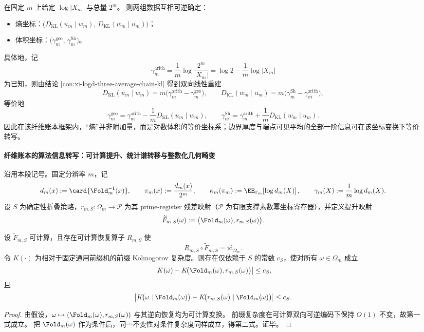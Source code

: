 \begin{conclusion}\label{con:xi-entropy-volume-dual-coordinates}
在固定 \(m\) 上给定 \(\log|X_m|\) 与总量 \(2^m\)。
则两组数据互相可逆确定：
\begin{itemize}
  \item 熵坐标：\(\bigl(D_{\mathrm{KL}}(u_m\mid w_m),\,D_{\mathrm{KL}}(w_m\mid u_m)\bigr)\)；
  \item 体积坐标：\(\bigl(\gamma_m^{\mathrm{geo}},\,\gamma_m^{\mathrm{Sh}}\bigr)\)。
\end{itemize}
具体地，记
\[
\gamma_m^{\mathrm{arith}}
=\frac{1}{m}\log\frac{2^m}{|X_m|}
=\log 2-\frac{1}{m}\log|X_m|
\]
为已知，则由结论 \ref{con:xi-logd-three-average-chain-kl} 得到双向线性重建
\[
D_{\mathrm{KL}}(u_m\mid w_m)=m\bigl(\gamma_m^{\mathrm{arith}}-\gamma_m^{\mathrm{geo}}\bigr),
\qquad
D_{\mathrm{KL}}(w_m\mid u_m)=m\bigl(\gamma_m^{\mathrm{Sh}}-\gamma_m^{\mathrm{arith}}\bigr),
\]
等价地
\[
\gamma_m^{\mathrm{geo}}=\gamma_m^{\mathrm{arith}}-\frac{1}{m}D_{\mathrm{KL}}(u_m\mid w_m),
\qquad
\gamma_m^{\mathrm{Sh}}=\gamma_m^{\mathrm{arith}}+\frac{1}{m}D_{\mathrm{KL}}(w_m\mid u_m).
\]
因此在该纤维账本框架内，“熵”并非附加量，而是对数体积的等价坐标系；边界厚度与端点可见平均的全部一阶信息可在该坐标变换下等价转写。
\end{conclusion}

\paragraph{纤维账本的算法信息转写：可计算提升、统计谱转移与整数化几何畸变}
沿用本段记号。固定分辨率 \(m\)，记
\[
d_m(x):=\card{\Fold_m^{-1}(x)},
\qquad
\pi_m(x):=\frac{d_m(x)}{2^m},
\qquad
\kappa_m(\pi_m):=\EE_{\pi_m}\!\left[\log d_m(X)\right],
\qquad
\gamma_m(X):=\frac{1}{m}\log d_m(X).
\]
设 \(S\) 为确定性折叠策略，\(r_{m,S}:\Omega_m\to\mathcal P\) 为其 prime-register 残差映射（\(\mathcal P\) 为有限支撑素数幂坐标寄存器），并定义提升映射
\[
\widetilde F_{m,S}(\omega):=\bigl(\Fold_m(\omega),r_{m,S}(\omega)\bigr).
\]

\begin{theorem}\label{thm:xi-godel-externalized-algorithmic-information-conservation}
设 \(\widetilde F_{m,S}\) 可计算，且存在可计算恢复算子 \(R_{m,S}\) 使
\[
R_{m,S}\circ \widetilde F_{m,S}=\mathrm{id}_{\Omega_m}.
\]
令 \(K(\cdot)\) 为相对于固定通用前缀机的前缀 Kolmogorov 复杂度。则存在仅依赖于 \(S\) 的常数 \(c_S\)，使对所有 \(\omega\in\Omega_m\) 成立
\[
\left|K(\omega)-K\!\bigl(\Fold_m(\omega),r_{m,S}(\omega)\bigr)\right|\le c_S,
\]
且
\[
\left|K\!\bigl(\omega\mid \Fold_m(\omega)\bigr)-K\!\bigl(r_{m,S}(\omega)\mid \Fold_m(\omega)\bigr)\right|\le c_S.
\]
\end{theorem}
\begin{proof}
由假设，\(\omega\mapsto (\Fold_m(\omega),r_{m,S}(\omega))\) 与其逆向恢复均为可计算变换。
前缀复杂度在可计算双向可逆编码下保持 \(O(1)\) 不变，故第一式成立。
把 \(\Fold_m(\omega)\) 作为条件后，同一不变性对条件复杂度同样成立，得第二式。证毕。
\end{proof}

